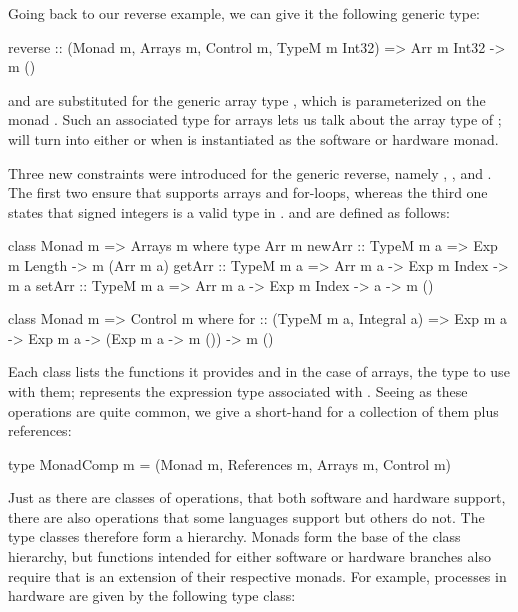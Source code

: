 \documentclass[../paper.tex]{subfiles}
\begin{document}
Going back to our reverse example, we can give it the following generic type:

\begin{code}
reverse :: (Monad m, Arrays m, Control m, TypeM m Int32)
        => Arr m Int32 -> m ()
\end{code}

\noindent {} and  are substituted for the generic array type , which is parameterized on the monad . Such an associated type for arrays lets us talk about the array type of ;  will turn into either  or  when  is instantiated as the software or hardware monad.

Three new constraints were introduced for the generic reverse, namely , , and . The first two ensure that  supports arrays and for-loops, whereas the third one states that signed integers is a valid type in .  and  are defined as follows:

\begin{code}
class Monad m => Arrays m where
  type Arr m
  newArr :: TypeM m a => Exp m Length -> m (Arr m a)
  getArr :: TypeM m a => Arr m a -> Exp m Index -> m a
  setArr :: TypeM m a => Arr m a -> Exp m Index -> a -> m ()

class Monad m => Control m where
  for :: (TypeM m a, Integral a) => Exp m a -> Exp m a -> (Exp m a -> m ())
      -> m ()
\end{code}

\noindent Each class lists the functions it provides and in the case of arrays, the type to use with them;  represents the expression type associated with . Seeing as these operations are quite common, we give a short-hand for a collection of them plus references:

\begin{code}
type MonadComp m = (Monad m, References m, Arrays m, Control m)
\end{code}

Just as there are classes of operations, that both software and hardware support, there are also operations that some languages support but others do not. The type classes therefore form a hierarchy. Monads form the base of the class hierarchy, but functions intended for either software or hardware branches also require that  is an extension of their respective monads. For example, processes in hardware are given by the following type class:
\end{document}

